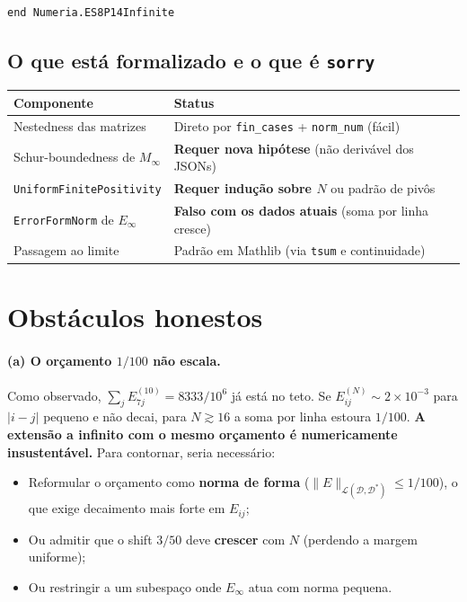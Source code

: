 \documentclass[11pt,a4paper]{article}
\theoremstyle{definition}
\theoremstyle{remark}
\newcommand{\Lin}{\mathcal{L}}
\newcommand{\D}{\mathcal{D}}
\begin{document}
\begin{lstlisting}[language=Lean4,caption={Esqueleto Lean 4 para a passagem ao limite infinito.}]
end Numeria.ES8P14Infinite
\end{lstlisting}

\subsection*{O que está formalizado e o que é \texttt{sorry}}

\begin{table}[h!]
\centering
\begin{tabular}{l l}
\toprule
Componente & Status \\
\midrule
Nestedness das matrizes & Direto por \texttt{fin\_cases} + \texttt{norm\_num} (fácil) \\
Schur-boundedness de \(M_\infty\) & \textbf{Requer nova hipótese} (não derivável dos JSONs) \\
\texttt{UniformFinitePositivity} & \textbf{Requer indução sobre \(N\)} ou padrão de pivôs \\
\texttt{ErrorFormNorm} de \(E_\infty\) & \textbf{Falso com os dados atuais} (soma por linha cresce) \\
Passagem ao limite & Padrão em Mathlib (via \texttt{tsum} e continuidade) \\
\bottomrule
\end{tabular}
\end{table}

\section{Obstáculos honestos}

\paragraph{(a) O orçamento \(1/100\) não escala.}
Como observado, \(\sum_j E^{(10)}_{7j} = 8333/10^6\) já está no teto. Se
\(E^{(N)}_{ij}\sim 2\times 10^{-3}\) para \(|i-j|\) pequeno e não decai, para
\(N \gtrsim 16\) a soma por linha estoura \(1/100\). \textbf{A extensão a
infinito com o mesmo orçamento é numericamente insustentável.} Para contornar,
seria necessário:
\begin{itemize}
  \item Reformular o orçamento como \textbf{norma de forma}
        (\(\|E\|_{\Lin(\D,\D^*)}\le 1/100\)), o que exige decaimento mais
        forte em \(E_{ij}\);
  \item Ou admitir que o shift \(3/50\) deve \textbf{crescer} com \(N\)
        (perdendo a margem uniforme);
  \item Ou restringir a um subespaço onde \(E_\infty\) atua com norma pequena.
\end{itemize}
\end{document}
